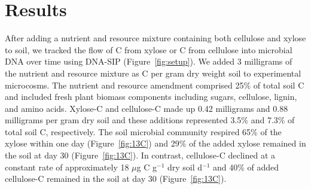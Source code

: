 \section{Results}
After adding a nutrient and resource mixture containing
both cellulose and xylose to soil, we tracked the flow of C from xylose or
C from cellulose into microbial DNA over time using DNA-SIP
(Figure~\ref{fig:setup}). We added 3 milligrams of the nutrient and resource
mixture as C per gram dry weight soil to experimental microcosms. The nutrient
and resource amendment comprised 25\% of total soil C and included fresh plant
biomass components including sugars, cellulose, lignin, and amino acids.
Xylose-C and cellulose-C made up 0.42 milligrams and 0.88 milligrams per gram
dry soil and these additions represented 3.5\% and 7.3\% of total soil C,
respectively. The soil microbial community respired 65\% of the xylose within
one day (Figure~\ref{fig:13C}) and 29\% of the added xylose remained in the
soil at day 30 (Figure~\ref{fig:13C}). In contrast, cellulose-C declined at
a constant rate of approximately 18 $\mu$g C g$^{-1}$ dry soil d$^{-1}$ and
40\% of added cellulose-C remained in the soil at day 30
(Figure~\ref{fig:13C}). 

